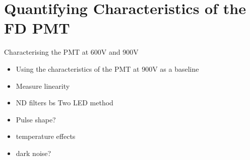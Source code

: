 \chapter{Quantifying Characteristics of the FD PMT}\label{Ch:PMTCharacter}

Characterising the PMT at 600V and 900V
\begin{itemize}
\item Using the characteristics of the PMT at 900V as a baseline
\item Measure linearity
\item ND filters bs Two LED method
\item Pulse shape?
\item temperature effects
\item dark noise?
\end{itemize}